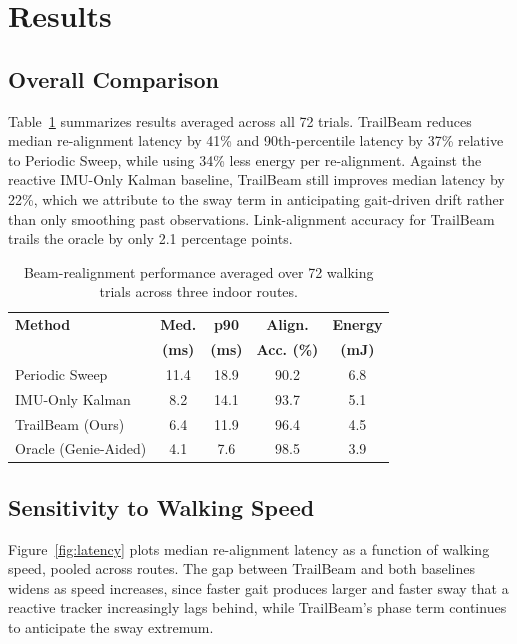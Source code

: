 \section{Results}
\subsection{Overall Comparison}
Table~\ref{tab:results} summarizes results averaged across all 72 trials. TrailBeam reduces median re-alignment latency by 41\% and 90th-percentile latency by 37\% relative to Periodic Sweep, while using 34\% less energy per re-alignment. Against the reactive IMU-Only Kalman baseline, TrailBeam still improves median latency by 22\%, which we attribute to the sway term in  anticipating gait-driven drift rather than only smoothing past observations. Link-alignment accuracy for TrailBeam trails the oracle by only 2.1 percentage points.

\begin{table}[t]
\centering
\footnotesize
\caption{Beam-realignment performance averaged over 72 walking trials across three indoor routes.}
\label{tab:results}
\begin{tabular}{lcccc}
\toprule
\rowcolor{steelblue!10}
\textbf{Method} & \textbf{Med.} & \textbf{p90} & \textbf{Align.} & \textbf{Energy} \\
\rowcolor{steelblue!10}
 & \textbf{(ms)} & \textbf{(ms)} & \textbf{Acc. (\%)} & \textbf{(mJ)} \\
\midrule
Periodic Sweep      & 11.4 & 18.9 & 90.2 & 6.8 \\
IMU-Only Kalman      & 8.2  & 14.1 & 93.7 & 5.1 \\
TrailBeam (Ours)     & 6.4  & 11.9 & 96.4 & 4.5 \\
\midrule
Oracle (Genie-Aided) & 4.1  & 7.6  & 98.5 & 3.9 \\
\bottomrule
\end{tabular}
\end{table}

\subsection{Sensitivity to Walking Speed}
Figure~\ref{fig:latency} plots median re-alignment latency as a function of walking speed, pooled across routes. The gap between TrailBeam and both baselines widens as speed increases, since faster gait produces larger and faster sway that a reactive tracker increasingly lags behind, while TrailBeam's phase term continues to anticipate the sway extremum.

